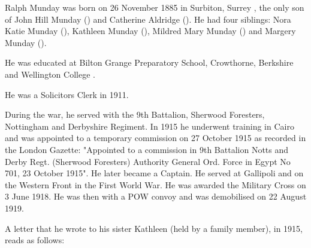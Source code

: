 
Ralph Munday was born on 26 November 1885 in Surbiton, Surrey \cite{RMundayBirth},  the only son of John Hill Munday () and Catherine Aldridge (). He had four siblings: Nora Katie Munday (), Kathleen Munday (), Mildred Mary Munday () and Margery Munday ().

He was educated at Bilton Grange Preparatory School, Crowthorne, Berkshire and Wellington College \cite{RMundayEducation}.

He was a Solicitors Clerk in 1911\cite{RMundayOccupation}. 

During the war, he served with the 9th Battalion, Sherwood Foresters, Nottingham and Derbyshire Regiment. In 1915 he underwent training in Cairo and was appointed to a temporary commission on 27 October 1915 \cite{RMundayWar} as recorded in the London Gazette:  "Appointed to a commission in 9th Battalion Notts and Derby Regt. (Sherwood Foresters) Authority General Ord. Force in Egypt No 701, 23 October 1915".  He later became a Captain. He  served at Gallipoli and on the Western Front in the First World War. He was awarded the Military Cross on 3 June 1918. He was then with a POW convoy and was demobilised on 22 August 1919.

A letter that he wrote to his sister Kathleen (held by a family member), in 1915, reads as follows:

